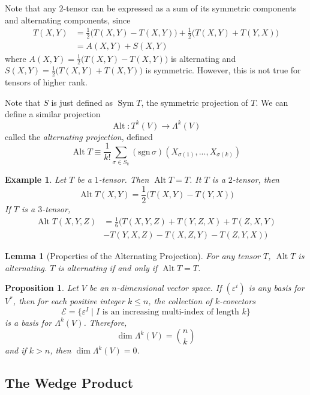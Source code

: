 \documentclass{article}
\DeclareMathOperator{\Sym}{Sym}
\DeclareMathOperator{\Alt}{Alt}
\newtheorem{proposition}[theorem]{Proposition}
\newtheorem{lemma}[theorem]{Lemma}
\newtheorem{example}{Example}[section]
\theoremstyle{remark}
\theoremstyle{definition}
\begin{document}
    Note that any $2$-tensor can be expressed as a sum of its symmetric components and alternating components, since
    \begin{align*}
        T(X, Y) & = \frac{1}{2} \big( T(X, Y) - T(X, Y)\big) + \frac{1}{2} \big( T(X, Y) + T(Y, X) \big) \\
        & = A(X, Y) + S(X, Y)
    \end{align*}
    where $A(X, Y) = \frac{1}{2} \big( T(X, Y) - T(X, Y) \big)$ is alternating and $S (X, Y) = \frac{1}{2} \big( T(X, Y) + T(X, Y) \big)$ is symmetric. However, this is not true for tensors of higher rank. 

    Note that $S$ is just defined as $\Sym{T}$, the symmetric projection of $T$. We can define a similar projection 
    \[\Alt: T^k (V) \longrightarrow \Lambda^k (V)\]
    called the \textit{alternating projection}, defined
    \[\Alt{T} \equiv \frac{1}{k!} \sum_{\sigma \in S_k} (\text{sgn}\,\sigma) (X_{\sigma(1)}, ..., X_{\sigma(k)})\]

    \begin{example}
    Let $T$ be a $1$-tensor. Then $\Alt{T} = T$. It $T$ is a $2$-tensor, then
    \[\Alt{T(X, Y)} = \frac{1}{2} \big(T(X, Y) - T(Y, X) \big)\]
    If $T$ is a $3$-tensor, 
    \begin{align*}
        \Alt{T(X, Y, Z)} & = \frac{1}{6} \big( T(X, Y, Z) + T(Y, Z, X) + T(Z, X, Y) \\ & - T(Y, X, Z) - T(X, Z, Y) - T(Z, Y, X) \big)  
    \end{align*}
    \end{example}

    \begin{lemma}[Properties of the Alternating Projection]
    For any tensor $T$, $\Alt{T}$ is alternating. $T$ is alternating if and only if $\Alt{T} = T$. 
    \end{lemma}

    \begin{proposition}
    Let $V$ be an $n$-dimensional vector space. If $(\varepsilon^i)$ is any basis for $V^*$, then for each positive integer $k \leq n$, the collection of $k$-covectors 
    \[\mathcal{E} = \{\varepsilon^I \;|\; I \text{ is an increasing multi-index of length } k\}\]
    is a basis for $\Lambda^k (V)$. Therefore, 
      \[\dim \Lambda^k (V) = \binom{n}{k}\]
    and if $k > n$, then $\dim{\Lambda^k (V)} = 0$. 
    \end{proposition}

  \subsection{The Wedge Product}
\end{document}
